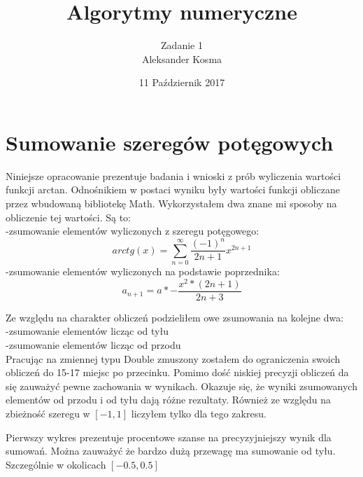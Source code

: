 \documentclass[10pt]{article}
\title{Algorytmy numeryczne}
\author{Zadanie 1 \\ Aleksander Kosma}
\date{11 Październik 2017}
\begin{document}
\maketitle 

\section{Sumowanie szeregów potęgowych}



Niniejsze opracowanie prezentuje badania i wnioski z prób wyliczenia wartości funkcji arctan.
Odnośnikiem w postaci wyniku były wartości funkcji obliczane przez wbudowaną bibliotekę Math.
Wykorzystałem dwa znane mi sposoby na obliczenie tej wartości. Są to:\\
-zsumowanie elementów wyliczonych z szeregu potęgowego:\\
$$arctg(x) = \sum_{n=0}^{\infty}\frac{(-1)^n}{2n + 1} x^{2n + 1}$$
-zsumowanie elementów wyliczonych na podstawie poprzednika:\\
$$a_{n+1}= a *-\frac{x^2 * (2n + 1)}{2n + 3}$$

Ze względu na charakter obliczeń podzieliłem owe zsumowania na kolejne dwa:\\
-zsumowanie elementów licząc od tyłu\\
-zsumowanie elementów licząc od przodu\\

Pracując na zmiennej typu Double zmuszony zostałem do ograniczenia swoich obliczeń do 15-17 miejsc po przecinku.
Pomimo dość niskiej precyzji obliczeń da się zauważyć pewne zachowania w wynikach. Okazuje się, że wyniki
zsumowanych elementów od przodu i od tyłu dają różne rezultaty. Również ze względu na zbieżność szeregu w $[-1,1]$ 
liczyłem tylko dla tego zakresu.

Pierwszy wykres prezentuje procentowe szanse na precyzyjniejszy wynik dla sumowań.
Można zauważyć że bardzo dużą przewagę ma sumowanie od tyłu. Szczególnie w okolicach $[-0.5,0.5]$

\begin{center}
\end{center}
\end{document}
